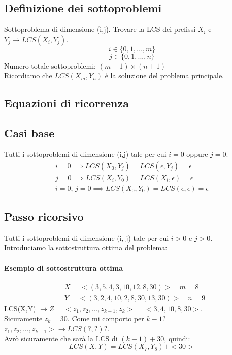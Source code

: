  \subsection{Definizione dei sottoproblemi}
 Sottoproblema di dimensione (i,j).
 Trovare la LCS dei prefissi $X_i$ e $Y_j \rightarrow LCS(X_i, Y_j)$.
 \[i \in \{0,1, ..., m\}\]
 \[j \in \{0,1,...,n\}\]
 Numero totale sottoproblemi: $(m+1)\times(n+1)$\\
 Ricordiamo che $LCS(X_m,Y_n)$ è la soluzione del problema principale.
 \subsection{Equazioni di ricorrenza}
 \subsection*{Casi base}
 Tutti i sottoproblemi di dimensione (i,j) tale per cui $i=0$ oppure $j=0$.
\begin{align*}
    i= 0 \implies LCS(X_0, Y_j) = LCS(\epsilon, Y_j) = \epsilon \\
    j = 0 \implies LCS(X_i, Y_0) = LCS(X_i, \epsilon) = \epsilon \\
    i = 0,\, j=0 \implies LCS(X_0, Y_0) = LCS(\epsilon, \epsilon) = \epsilon
\end{align*}
\subsection*{Passo ricorsivo}
Tutti i sottoproblemi di dimensione (i, j) tale per cui $i>0$ e $j>0$.\\
Introduciamo la sottostruttura ottima del problema:
\paragraph*{Esempio di sottostruttura ottima}
\begin{align*}
    &X= <(3, 5, 4, 3, 10, 12, 8, 30)> \quad m=8\\
    &Y = <(3, 2, 4, 10, 2, 8, 30, 13, 30)> \quad n=9
\end{align*}
LCS(X,Y) $\rightarrow Z = <z_1, z_2, \dots, z_{k-1}, z_k> = <3,4,10,8,30>$.\\
Sicuramente $z_k=30$. Come mi comporto per $k-1$? $z_1, z_2, ..., z_{k-1}> \rightarrow LCS(?,?)?$.\\
Avrò sicuramente che sarà la LCS di $(k-1)+30$, quindi:
\[LCS(X,Y)=LCS(X_7, Y_8) + <30>\]
